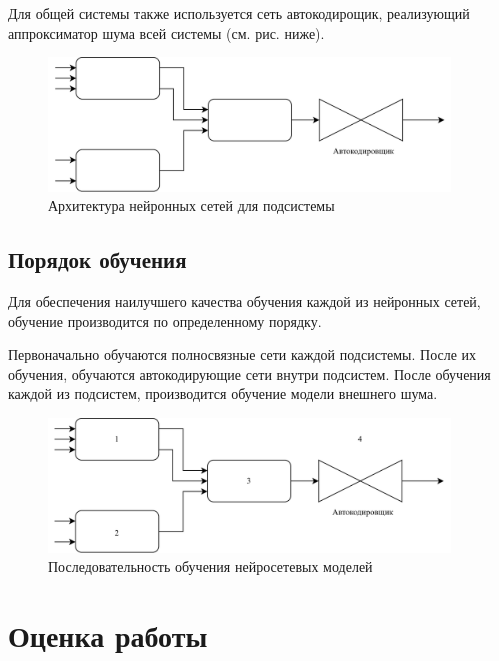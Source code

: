 Для общей системы также используется сеть автокодирощик, реализующий
аппроксиматор шума всей системы (см. рис. ниже).

\begin{figure}[H]
  \begin{center}
    \includegraphics[width=0.95\textwidth]{figures/nn_full.png}
  \end{center}
  \caption{Архитектура нейронных сетей для подсистемы}\label{fig:nn:full}
\end{figure}

\subsection{Порядок обучения}

Для обеспечения наилучшего качества обучения каждой из нейронных сетей, обучение
производится по определенному порядку. 

Первоначально обучаются полносвязные сети каждой подсистемы. После их обучения,
обучаются автокодирующие сети внутри подсистем. После обучения каждой из
подсистем, производится обучение модели внешнего шума. 

\begin{figure}[H]
  \begin{center}
    \includegraphics[width=0.95\textwidth]{figures/nn_full_learning.png}
  \end{center}
  \caption{Последовательность обучения нейросетевых
  моделей}\label{fig:nn:learning}
\end{figure}



\section{Оценка работы}


